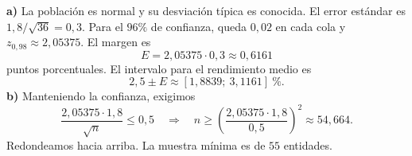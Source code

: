 \textbf{a)} La población es normal y su desviación típica es conocida. El error estándar es $1{,}8/\sqrt{36}=0{,}3$. Para el $96\%$ de confianza, queda $0{,}02$ en cada cola y $z_{0{,}98}\approx2{,}05375$. El margen es
\[
 E=2{,}05375\cdot0{,}3\approx\boxed{0{,}6161}
\]
puntos porcentuales. El intervalo para el rendimiento medio es
\[
 2{,}5\pm E\approx\boxed{[1{,}8839;\ 3{,}1161]}\ \%.
\]
\textbf{b)} Manteniendo la confianza, exigimos
\[
 \frac{2{,}05375\cdot1{,}8}{\sqrt n}\le0{,}5
 \quad\Longrightarrow\quad
 n\ge\left(\frac{2{,}05375\cdot1{,}8}{0{,}5}\right)^2
 \approx54{,}664.
\]
Redondeamos hacia arriba. La muestra mínima es de $\boxed{55}$ entidades.
